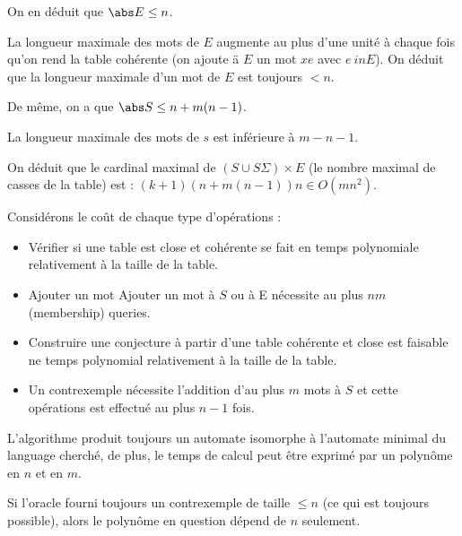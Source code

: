 On en déduit que $\abs E \leq n$.

La longueur maximale des mots de $E$ augmente au plus d'une unité à chaque fois qu'on rend la table cohérente
(on ajoute ä $E$ un mot $xe$ avec $e\ in E$). On déduit que la longueur maximale d'un mot de $E$ est toujours $<n$.

De même, on a que  $\abs S \leq n + m(n-1)$. %

La longueur maximale des mots de $s$ est inférieure à $m - n -1$.


On déduit que le cardinal maximal de $(S \cup S \Sigma) \times E$ (le nombre maximal de casses de la table) est : $(k+1)(n+m(n-1))n \in O(mn^2)$.


Considérons le coût de chaque type d'opérations :
\begin{itemize}
	\item Vérifier si une table est close et cohérente se fait en temps polynomiale relativement à la taille de la table.
	\item Ajouter un mot  Ajouter un mot à $S$ ou à E nécessite au plus $nm$ (membership) queries.
	\item Construire une conjecture à partir d'une table cohérente et close est faisable ne temps polynomial relativement à
	      la taille de la table.
	\item Un contrexemple nécessite l'addition d'au plus $m$ mots à $S$ et cette opérations est effectué au plus $n-1$ fois.
\end{itemize}

\begin{theorem}
	L'algorithme produit toujours un automate isomorphe à l'automate minimal du language cherché, de plus, le temps de calcul peut être
	exprimé par un polynôme en $n$ et en $m$.
\end{theorem}

\begin{remarque}
	Si l'oracle fourni toujours un contrexemple de taille $\leq n$ (ce qui est toujours possible), alors le polynôme en question dépend de $n$ seulement.
\end{remarque}

